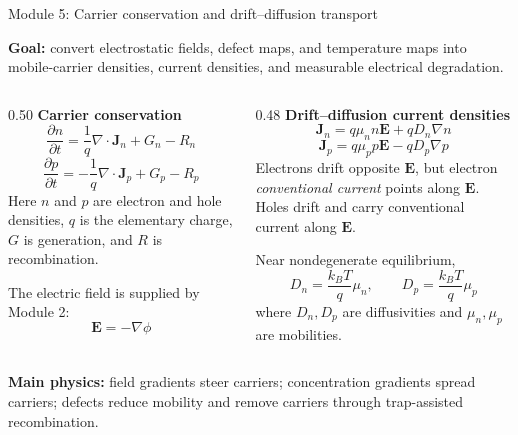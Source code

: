 \documentclass[aspectratio=169,9pt]{beamer}
\newcommand{\Evec}{\bm{E}}
\newcommand{\Jn}{\bm{J}_n}
\newcommand{\Jp}{\bm{J}_p}
\begin{document}
\begin{frame}{Module 5: Carrier conservation and drift--diffusion transport}
\footnotesize
\vspace{-4mm}
\begin{bluebox}
\centering\small
\textbf{Goal:} convert electrostatic fields, defect maps, and temperature maps into mobile-carrier densities, current densities, and measurable electrical degradation.
\end{bluebox}

\vspace{1mm}
\begin{columns}[T,totalwidth=\textwidth]
\begin{column}{0.50\textwidth}
\textbf{Carrier conservation}
\begin{equation*}
\boxed{\frac{\partial n}{\partial t}=\frac{1}{q}\nabla\cdot\Jn+G_n-R_n}
\end{equation*}
\begin{equation*}
\boxed{\frac{\partial p}{\partial t}=-\frac{1}{q}\nabla\cdot\Jp+G_p-R_p}
\end{equation*}
\small
Here \(n\) and \(p\) are electron and hole densities, \(q\) is the elementary charge, \(G\) is generation, and \(R\) is recombination.

\vspace{1mm}
The electric field is supplied by Module 2:
\begin{equation*}
\boxed{\Evec=-\nabla \phi}
\end{equation*}
\end{column}

\begin{column}{0.48\textwidth}
\textbf{Drift--diffusion current densities}
\begin{equation*}
\boxed{\Jn=q\mu_n n\Evec+qD_n\nabla n}
\end{equation*}
\begin{equation*}
\boxed{\Jp=q\mu_p p\Evec-qD_p\nabla p}
\end{equation*}
\small
Electrons drift opposite \(\Evec\), but electron \emph{conventional current} points along \(\Evec\). Holes drift and carry conventional current along \(\Evec\).

\vspace{1mm}
Near nondegenerate equilibrium,
\begin{equation*}
\boxed{D_n=\frac{k_B T}{q}\mu_n},\qquad
\boxed{D_p=\frac{k_B T}{q}\mu_p}
\end{equation*}
\small
where \(D_n,D_p\) are diffusivities and \(\mu_n,\mu_p\) are mobilities.
\end{column}
\end{columns}

\vspace{1mm}
\begin{orangebox}
\centering\scriptsize
\textbf{Main physics:} field gradients steer carriers; concentration gradients spread carriers; defects reduce mobility and remove carriers through trap-assisted recombination.
\end{orangebox}
\end{frame}
\end{document}
